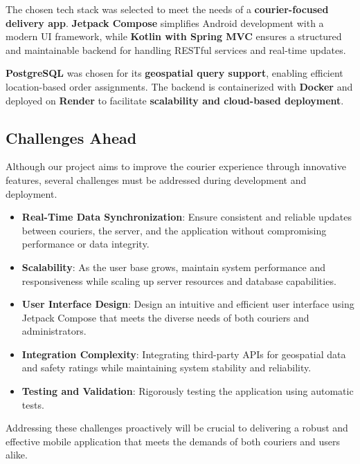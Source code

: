 \documentclass[a4paper,twoside,11pt]{article}
\begin{document}
{The chosen tech stack was selected to meet the needs of a \textbf{courier-focused delivery app}. \textbf{Jetpack Compose} simplifies Android development with a modern UI framework, while \textbf{Kotlin with Spring MVC} ensures a structured and maintainable backend for handling RESTful services and real-time updates.  

\vspace{2mm}

\textbf{PostgreSQL} was chosen for its \textbf{geospatial query support}, enabling efficient location-based order assignments. The backend is containerized with \textbf{Docker} and deployed on \textbf{Render} to facilitate \textbf{scalability and cloud-based deployment}.  

\subsection*{Challenges Ahead}

Although our project aims to improve the courier experience through innovative features, several challenges must be addressed during development and deployment.

\begin{itemize}
\item \textbf{Real-Time Data Synchronization}: Ensure consistent and reliable updates between couriers, the server, and the application without compromising performance or data integrity.

\item \textbf{Scalability}: As the user base grows, maintain system performance and responsiveness while scaling up server resources and database capabilities.

\item \textbf{User Interface Design}: Design an intuitive and efficient user interface using Jetpack Compose that meets the diverse needs of both couriers and administrators.

\item \textbf{Integration Complexity}: Integrating third-party APIs for geospatial data and safety ratings while maintaining system stability and reliability.

\item \textbf{Testing and Validation}: Rigorously testing the application using automatic tests.
\end{itemize}

Addressing these challenges proactively will be crucial to delivering a robust and effective mobile application that meets the demands of both couriers and users alike.

}
\end{document}
